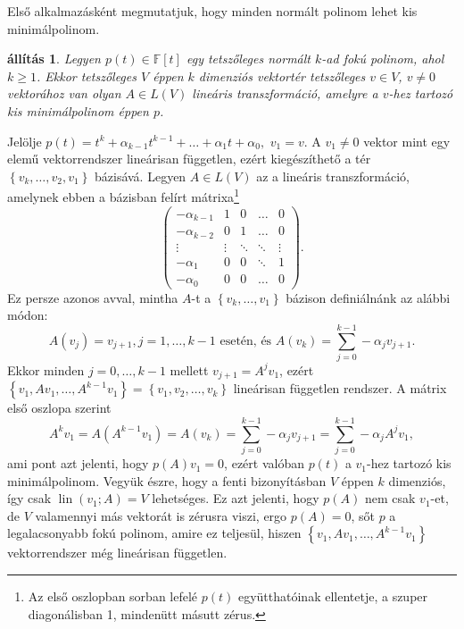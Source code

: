 \documentclass[9pt, a4paper, showtrims]{memoir}
\makeatletter
\renewenvironment{proof}[1][\proofname]
    {\par\pushQED{\qed}%
    \normalfont \topsep6\p@\@plus6\p@\relax
    \trivlist
    \item[\hskip\labelsep
        \itshape
    #1\@addpunct{:}]\ignorespaces}
    {\popQED\endtrivlist\@endpefalse}
\theoremstyle{plain}
\newtheorem{proposition}{állítás}[chapter]
\theoremstyle{remark}
\theoremstyle{definition}
\DeclareMathOperator{\lin}{lin}
\makeatother
\begin{document}
Első alkalmazásként megmutatjuk, hogy minden normált polinom lehet kis minimálpolinom.
\begin{proposition}\label{pr:polinom-kis-minimalpolinom}
    Legyen $p\left( t \right)\in\mathbb{F}\left[ t \right]$ egy tetszőleges normált $k$-ad fokú polinom, ahol $k\geq 1$.
    Ekkor tetszőleges $V$ éppen $k$ dimenziós vektortér tetszőleges $v\in V$, $v\neq 0$ vektorához van olyan $A\in L\left( V \right)$
    lineáris transzformáció, amelyre a $v$-hez tartozó kis minimálpolinom éppen $p$.
\end{proposition}
\begin{proof}
    Jelölje 
    \(
    p\left( t \right)=t^k+\alpha_{k-1}t^{k-1}+\dots+\alpha_1t+\alpha_0,
    \)
    $v_1=v.$ 
    A $v_1\neq 0$ vektor mint egy elemű vektorrendszer lineárisan független, ezért kiegészíthető a tér
    $\left\{ v_k,\ldots,v_2,v_1 \right\}$ bázisává.
    Legyen $A\in L\left( V \right)$ az a lineáris transzformáció, 
    amelynek ebben a bázisban felírt mátrixa\footnote{Az első oszlopban sorban lefelé $p\left( t \right)$ együtthatóinak ellentetje, a szuper diagonálisban 1, mindenütt másutt zérus.}
    \[
        \begin{pmatrix}
            -\alpha_{k-1}&1&0&\dots&0\\
            -\alpha_{k-2}&0&1&\dots&0\\
            \vdots       &\vdots &\ddots & \ddots    &\vdots\\
            -\alpha_1    &0&0&\ddots&1\\
            -\alpha_0    &0&0&\dots&0
        \end{pmatrix}.
    \]
    Ez persze azonos avval, mintha $A$-t a $\left\{ v_k,\ldots,v_1 \right\}$
    bázison definiálnánk az alábbi módon:
    \[
        A\left( v_j \right)=v_{j+1}, j=1,\ldots,k-1\mbox{ esetén, és } 
        A\left( v_k \right)=\sum_{j=0}^{k-1}-\alpha_jv_{j+1}.
    \]
    Ekkor minden $j=0,\ldots,k-1$ mellett $v_{j+1}=A^jv_1$, 
    ezért $\left\{ v_1,Av_1,\ldots,A^{k-1}v_1 \right\}=\left\{ v_1,v_2,\ldots,v_{k} \right\}$ lineárisan független rendszer.
    A mátrix első oszlopa szerint 
    \[
        A^kv_1=
        A\left( A^{k-1}v_1 \right)=
        A\left( v_k \right)=
        \sum_{j=0}^{k-1}-\alpha_jv_{j+1}=
        \sum_{j=0}^{k-1}-\alpha_jA^jv_1,
    \]
    ami pont azt jelenti, hogy $p(A)v_1=0$, 
    ezért valóban $p\left( t \right)$ a $v_1$-hez tartozó kis minimálpolinom.
\end{proof}
Vegyük észre, hogy a fenti bizonyításban
$V$ éppen $k$ dimenziós, így csak $\lin\left( v_1;A \right)=V$ lehetséges.
Ez azt jelenti, hogy $p\left( A \right)$ nem csak $v_1$-et, de $V$ valamennyi más vektorát is zérusra viszi,
ergo $p\left( A \right)=0$, sőt $p$ a legalacsonyabb fokú polinom, amire ez teljesül,
hiszen $\left\{ v_1,Av_1,\ldots,A^{k-1}v_1 \right\}$ vektorrendszer még lineárisan független.
\end{document}

